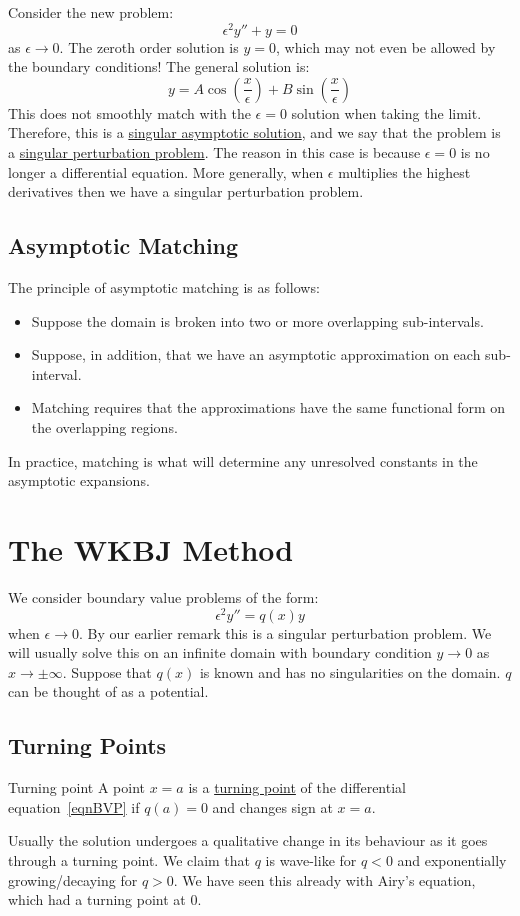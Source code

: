 \documentclass[../Main.tex]{subfiles}
\begin{document}
Consider the new problem:
\begin{equation*}
    \epsilon^2 y'' + y = 0
\end{equation*}
as $\epsilon \to 0$. The zeroth order solution is $y = 0$, which may not even be allowed by the boundary conditions! The general solution is:
\begin{equation*}
    y = A\cos\left(\frac x \epsilon\right) + B \sin\left(\frac x \epsilon\right)
\end{equation*}
This does not smoothly match with the $\epsilon = 0$ solution when taking the limit. Therefore, this is a \underline{singular asymptotic solution}, and we say that the problem is a \underline{singular perturbation problem}. The reason in this case is because $\epsilon = 0$ is no longer a differential equation. More generally, when $\epsilon$ multiplies the highest derivatives then we have a singular perturbation problem.

\subsection{Asymptotic Matching}
The principle of asymptotic matching is as follows:
\begin{itemize}
    \item Suppose the domain is broken into two or more overlapping sub-intervals.
    \item Suppose, in addition, that we have an asymptotic approximation on each sub-interval.
    \item Matching requires that the approximations have the same functional form on the overlapping regions.
\end{itemize}
In practice, matching is what will determine any unresolved constants in the asymptotic expansions.
\section{The WKBJ Method}
We consider boundary value problems of the form:
\begin{equation}
    \epsilon^2 y'' = q(x) y
    \label{eqnBVP}
\end{equation}
when $\epsilon \to 0$. By our earlier remark this is a singular perturbation problem. We will usually solve this on an infinite domain with boundary condition $y \to 0$ as $x \to \pm \infty$. Suppose that $q(x)$ is known and has no singularities on the domain. $q$ can be thought of as a potential.
\subsection{Turning Points}
\begin{definition}{Turning point}
    A point $x = a$ is a \underline{turning point} of the differential equation~\ref{eqnBVP} if $q(a) = 0$ and changes sign at $x = a$.
\end{definition}
Usually the solution undergoes a qualitative change in its behaviour as it goes through a turning point. We claim that $q$ is wave-like for $q < 0$ and exponentially growing/decaying for $q > 0$. We have seen this already with Airy's equation, which had a turning point at $0$.
\end{document}
